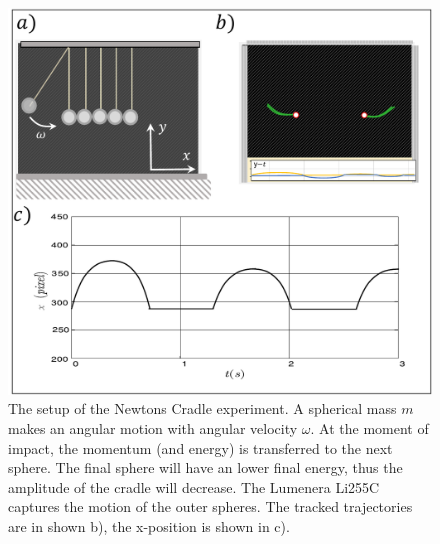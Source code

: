 \documentclass{article}
\begin{document}
\begin{figure}[H]
    \centering
    \includegraphics[width=12cm]{figures/Newtons_Cradle.pdf}
    \caption{The setup of the Newtons Cradle experiment. A spherical mass $m$ makes an angular motion with angular velocity $\omega$. At the moment of impact, the momentum (and energy) is transferred to the next sphere. The final sphere will have an lower final energy, thus the amplitude of the cradle will decrease. The Lumenera Li255C captures the motion of the outer spheres. The tracked trajectories are in shown b), the x-position is shown in c).}
    \label{Figure: Newtons cradle setup}
\end{figure}


\end{document}
